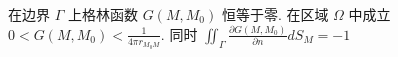 \documentclass[10pt]{yerbaformat}
\begin{document}
\par 在边界 $\Gamma$ 上格林函数 $G\left(M, M_{0}\right)$ 恒等于零. 在区域 $\Omega$ 中成立 $ 0<G\left(M, M_{0}\right)<\frac{1}{4 \pi r_{M_{0} M}}$. 同时 $\iint_{\Gamma} \frac{\partial G\left(M, M_{0}\right)}{\partial n} d S_{M}=-1$




\end{document}
